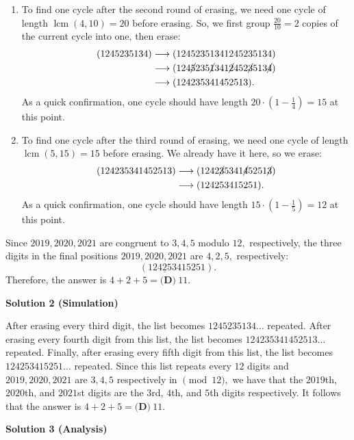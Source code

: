 \begin{enumerate}
\begin{enumerate}
        \item To find one cycle after the second round of erasing, we need one cycle of length $\operatorname{lcm}(4,10)=20$ before erasing. So, we first group $\frac{20}{10}=2$ copies of the current cycle into one, then erase:
 \begin{align*} (1245235134)&\longrightarrow(12452351341245235134) \\ &\longrightarrow(124\cancel{5}235\cancel{1}341\cancel{2}452\cancel{3}513\cancel{4}) \\ &\longrightarrow(124235341452513). \end{align*}
As a quick confirmation, one cycle should have length $20\cdot\left(1-\frac{1}{4}\right)=15$ at this point.

        \item To find one cycle after the third round of erasing, we need one cycle of length $\operatorname{lcm}(5,15)=15$ before erasing. We already have it here, so we erase:
 \begin{align*} (124235341452513)&\longrightarrow(1242\cancel{3}5341\cancel{4}5251\cancel{3}) \\ &\longrightarrow(124253415251). \end{align*}
As a quick confirmation, one cycle should have length $15\cdot\left(1-\frac{1}{5}\right)=12$ at this point.

            \end{enumerate}
            Since $2019,2020,2021$ are congruent to $3,4,5$ modulo $12,$ respectively, the three digits in the final positions $2019,2020,2021$ are $4,2,5,$ respectively: 
 \[(12\underline{425}3415251).\] Therefore, the answer is $4+2+5=\boxed{\textbf{(D)}\ 11}.$




\textbf{Solution 2 (Simulation)}

After erasing every third digit, the list becomes $1245235134\ldots$ repeated. After erasing every fourth digit from this list, the list becomes $124235341452513\ldots$ repeated. Finally, after erasing every fifth digit from this list, the list becomes $124253415251\ldots$ repeated. Since this list repeats every $12$ digits and $2019,2020,2021$ are $3,4,5$ respectively in $\pmod{12},$ we have that the $2019$th, $2020$th, and $2021$st digits are the $3$rd, $4$th, and $5$th digits respectively. It follows that the answer is $4+2+5= \boxed {\textbf{(D)}\ 11}.$




\textbf{Solution 3 (Analysis)}


\end{enumerate}
